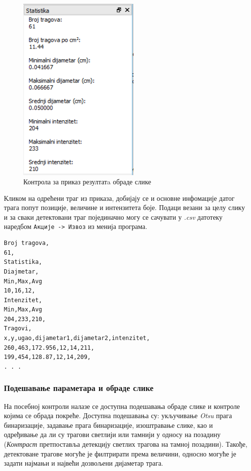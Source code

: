 \documentclass[11pt,a4paper,serbian,oneside]{book}
\begin{document}
\begin{figure}[H]
\begin{center}
\includegraphics[width=60mm]{images/stats.png}
\end{center}
\caption{Контрола за приказ резултатa обраде слике}
\label{fig:stats}
\end{figure}

Кликом на одрећени траг из приказа, добијају се и основне инфомације датог трага попут позиције, величине и интензитета боје. Подаци везани за целу слику и за сваки детектовани траг појединачно могу се сачувати у \textit{.csv} датотеку наредбом \texttt{Акције -> Извоз} из менија програма. 

\begin{lstlisting}[language=Xml,label=lst:stats,caption=Пример сачуваних резултата]
Broj tragova,
61,
Statistika,
Diajmetar,
Min,Max,Avg
10,16,12,
Intenzitet,
Min,Max,Avg
204,233,210,
Tragovi,
x,y,ugao,dijametar1,dijametar2,intenzitet,
260,463,172.956,12,14,211,
199,454,128.87,12,14,209,
. . .
\end{lstlisting}

\subsubsection{Подешавање параметара и обраде слике}

На посебној контроли налазе се доступна подешавања обраде слике и контроле којима се обрада покреће.
Доступна подешавања су: укључивање \textit{Otsu} прага бинаризације, задавање прага бинаризације, изоштравање слике, као и одређивање да ли су трагови светлији или тамнији у односу на позадину (\textit{Контраст} претпоставља детекцију светлих трагова на тамној позадини). Такође, детектоване трагове могуће је филтрирати према величини, односно могуће је задати најмањи и највећи дозвољени дијаметар трага. 
\end{document}
